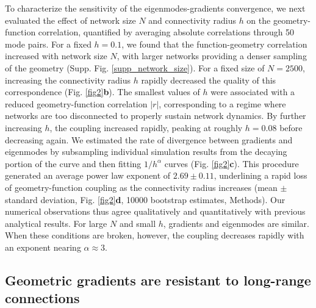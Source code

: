 \documentclass{article}
\begin{document}
To characterize the sensitivity of the eigenmodes-gradients convergence, we next evaluated the effect of network size $N$ and connectivity radius $h$ on the geometry-function correlation, quantified by averaging absolute correlations through 50 mode pairs. For a fixed $h=0.1$, we found that the function-geometry correlation increased with network size $N$, with larger networks providing a denser sampling of the geometry (Supp. Fig. \ref{supp_network_size}). For a fixed size of $N=2500$, increasing the connectivity radius $h$ rapidly decreased the quality of this correspondence (Fig. \ref{fig2}\textbf{b}). The smallest values of $h$ were associated with a reduced geometry-function correlation $|r|$, corresponding to a regime where networks are too disconnected to properly sustain network dynamics. By further increasing $h$, the coupling increased rapidly, peaking at roughly $h=0.08$ before decreasing again. We estimated the rate of divergence between gradients and eigenmodes by subsampling individual simulation results from the decaying portion of the curve and then fitting $1/h^\alpha$ curves (Fig. \ref{fig2}\textbf{c}). This procedure generated an average power law exponent of $2.69\pm0.11$, underlining a rapid loss of geometry-function coupling as the connectivity radius increases (mean $\pm$ standard deviation, Fig. \ref{fig2}\textbf{d}, 10000 bootstrap estimates, Methods). Our numerical observations thus agree qualitatively and quantitatively with previous analytical results\cite{GarcaTrillos2019}. For large $N$ and small $h$, gradients and eigenmodes are similar. When these conditions are broken, however, the coupling decreases rapidly with an exponent nearing $\alpha\approx3$.

\subsection*{Geometric gradients are resistant to long-range connections}
\end{document}
